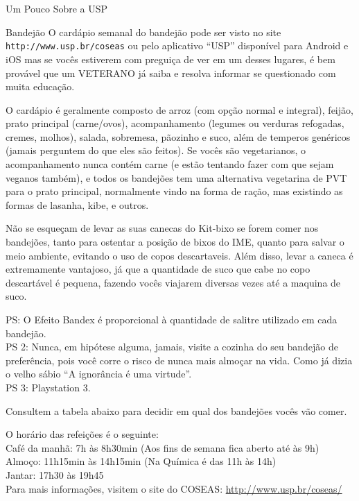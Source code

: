 \begin{secao}{Um Pouco Sobre a USP}
\begin{subsecao}{Bandejão}
O cardápio semanal do bandejão pode ser visto no site {\tt
http://www.usp.br/coseas} ou pelo aplicativo ``USP'' disponível para Android e
iOS mas se vocês estiverem com preguiça de ver em um desses lugares, é bem
provável que um VETERANO já saiba e resolva informar se questionado com muita
educação.

O cardápio é geralmente composto de arroz (com opção normal e integral), feijão,
prato principal (carne/ovos), acompanhamento (legumes ou verduras refogadas,
cremes, molhos), salada, sobremesa, pãozinho e suco, além de temperos genéricos
(jamais perguntem do que eles são feitos). Se vocês são vegetarianos, o
acompanhamento nunca contém carne (e estão tentando fazer com que sejam veganos
também), e todos os bandejões tem uma alternativa vegetarina de PVT para o
prato principal, normalmente vindo na forma de ração, mas existindo as formas
de lasanha, kibe, e outros.


Não se esqueçam de levar as suas canecas do Kit-bixo se forem comer nos
bandejões, tanto para ostentar a posição de bixos do IME, quanto para salvar o
meio ambiente, evitando o uso de copos descartaveis. Além disso, levar a caneca
é extremamente vantajoso, já que a quantidade de suco que cabe no copo
descartável é pequena, fazendo vocês viajarem diversas vezes até a maquina de
suco.

PS: O Efeito Bandex é proporcional à quantidade de salitre utilizado em cada
bandejão.\\
PS 2: Nunca, em hipótese alguma, jamais, visite a cozinha do seu bandejão de
preferência, pois você corre o risco de nunca mais almoçar na vida. Como já
dizia o velho sábio ``A ignorância é uma virtude''.\\
PS 3: Playstation 3.

Consultem a tabela abaixo para decidir em qual dos bandejões vocês vão comer.

O horário das refeições é o seguinte:\\
Café da manhã: 7h às 8h30min (Aos fins de semana fica aberto até às 9h)\\
Almoço: 11h15min às 14h15min (Na Química é das 11h às 14h)\\
Jantar: 17h30 às 19h45\\

Para mais informações, visitem o site do COSEAS: \href{http://www.usp.br/coseas/COSEASHP/COSEAS2010_restaurantes.html}{http://www.usp.br/coseas/}

\end{subsecao}


\end{secao}
